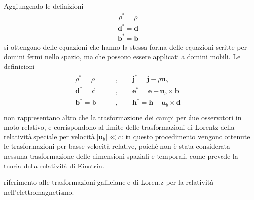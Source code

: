 \documentclass[letterpaper,10pt,english]{jupyterBook}
\begin{document}
\sphinxAtStartPar
Aggiungendo le definizioni
\begin{equation*}
\begin{split}\rho^* = \rho\end{split}
\end{equation*}\begin{equation*}
\begin{split}\mathbf{d}^* = \mathbf{d}\end{split}
\end{equation*}\begin{equation*}
\begin{split}\mathbf{b}^* = \mathbf{b}\end{split}
\end{equation*}
\sphinxAtStartPar
si ottengono delle equazioni che hanno la stessa forma delle equazioni scritte per domini fermi nello spazio, ma che possono essere applicati a domini mobili. Le definizioni
\begin{equation*}
\begin{split}\begin{aligned}
\rho^* = \rho \qquad & , \qquad \mathbf{j}^* = \mathbf{j} - \rho \mathbf{u}_b \\
\mathbf{d}^* = \mathbf{d} \qquad & , \qquad \mathbf{e}^* = \mathbf{e} + \mathbf{u}_b \times \mathbf{b} \\
\mathbf{b}^* = \mathbf{b} \qquad & , \qquad \mathbf{h}^* = \mathbf{h} - \mathbf{u}_b \times \mathbf{d} \\
\end{aligned}\end{split}
\end{equation*}
\sphinxAtStartPar
non rappresentano altro che la trasformazione dei campi per due osservatori in moto relativo, e corrispondono al limite delle trasformazioni di Lorentz della relatività speciale per velocità \(|\mathbf{u}_b| \ll c\): in questo procedimento vengono ottenute le trasformazioni per basse velocità relative, poiché non è stata considerata nessuna trasformazione delle dimensioni spaziali e temporali, come prevede la teoria della relatività di Einstein.

\sphinxAtStartPar
{} riferimento alle trasformazioni galileiane e di Lorentz per la relatività nell’elettromagnetismo.

\sphinxstepscope
\end{document}
